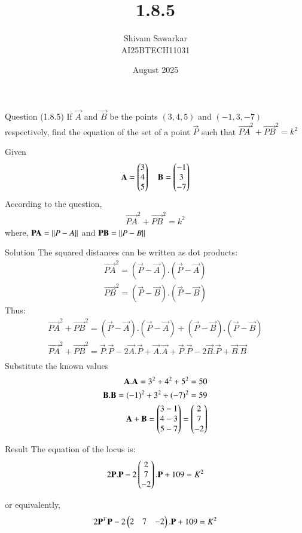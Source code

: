 \documentclass{beamer}
\title %
{1.8.5}
\date{August  2025}
\author %
{Shivam Sawarkar \\ AI25BTECH11031}
\begin{document}
\frame{\titlepage}
\begin{frame}{Question (1.8.5)}
If $\vec{A}$ and $\vec{B}$ be the points $(3,4,5)$ and $(-1,3,-7)$ respectively, find the equation of the set of a point $\vec{P}$ such that $\vec{PA}^2+\vec{PB}^2=k^2$
\end{frame}

\begin{frame}{Given}
    \begin{align}
    \mathbf{A}=\begin{pmatrix}3 \\ 4 \\ 5\end{pmatrix} \quad \mathbf{B}=\begin{pmatrix}-1 \\ 3 \\ -7\end{pmatrix}
\end{align}
According to the question,  
\begin{align}
    \vec{PA}^2+\vec{PB}^2=k^2
\end{align}
where, $\mathbf{PA}=\left\lVert P-A\right\rVert$ and $\mathbf{PB}=\left\lVert P-B\right\rVert$
\end{frame}

\begin{frame}{Solution}
    The squared distances can be written as dot products:
\begin{align}
    \vec{PA}^2=(\vec{P}-\vec{A}).(\vec{P}-\vec{A}) \\
    \vec{PB}^2=(\vec{P}-\vec{B}).(\vec{P}-\vec{B})
\end{align}
Thus:
\begin{align}
    \vec{PA}^2+\vec{PB}^2=(\vec{P}-\vec{A}).(\vec{P}-\vec{A})+(\vec{P}-\vec{B}).(\vec{P}-\vec{B}) \\
    \vec{PA}^2+\vec{PB}^2=\vec{P}.\vec{P}-2\vec{A}.\vec{P}+\vec{A}.\vec{A}+\vec{P}.\vec{P}-2\vec{B}.\vec{P}+\vec{B}.\vec{B}\\
\end{align}
Substitute the known values
\begin{align}
    \mathbf{A}.\mathbf{A}=3^2+4^2+5^2=50 \\
    \mathbf{B}.\mathbf{B}=(-1)^2+3^2+(-7)^2=59 \\
    \mathbf{A}+\mathbf{B}=\begin{pmatrix}3-1 \\ 4-3 \\ 5-7\end{pmatrix}=\begin{pmatrix}2 \\ 7 \\ -2\end{pmatrix}
\end{align}
\end{frame}

\begin{frame}{Result}
    The equation of the locus is:
\begin{align}
    2\mathbf{P}.\mathbf{P}-2\begin{pmatrix}2 \\ 7 \\ -2\end{pmatrix}.\mathbf{P}+109=K^2
\end{align}

or equivalently,
\begin{align}
    2\mathbf{P}^T\mathbf{P}-2\begin{pmatrix}2 & 7 & -2\end{pmatrix}.\mathbf{P}+109=K^2
\end{align}
\end{frame}
\end{document}
